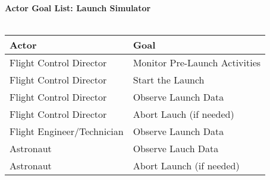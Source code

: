 \documentclass[letterpaper]{article}
\begin{document}
\noindent
\textbf{Actor Goal List: Launch Simulator}\\\\
\vspace{4ex}
\begin{tabular}{|p{5cm}|p{5cm}|}\hline
\textbf{Actor} & \textbf{Goal}\\\hline
Flight Control Director & Monitor Pre-Launch Activities\\\hline
Flight Control Director & Start the Launch\\\hline
Flight Control Director & Observe Launch Data\\\hline
Flight Control Director & Abort Lauch (if needed)\\\hline
Flight Engineer/Technician & Observe Launch Data\\\hline
Astronaut & Observe Lauch Data\\\hline
Astronaut & Abort Launch (if needed)\\\hline
\end{tabular}
\end{document}
